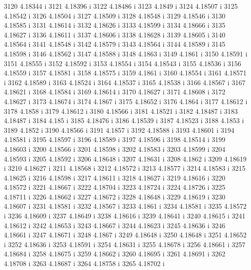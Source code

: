  3120  4.18344  i
 3121  4.18396  i
 3122  4.18486  i
 3123  4.1849  i
 3124  4.18507  i
 3125  4.18542  i
 3126  4.18504  i
 3127  4.18509  i
 3128  4.18548  i
 3129  4.18546  i
 3130  4.18585  i
 3131  4.18614  i
 3132  4.18626  i
 3133  4.18599  i
 3134  4.18666  i
 3135  4.18627  i
 3136  4.18611  i
 3137  4.18606  i
 3138  4.18628  i
 3139  4.18605  i
 3140  4.18564  i
 3141  4.18548  i
 3142  4.18579  i
 3143  4.18564  i
 3144  4.18589  i
 3145  4.18598  i
 3146  4.18562  i
 3147  4.18588  i
 3148  4.1863  i
 3149  4.1861  i
 3150  4.18591  i
 3151  4.18555  i
 3152  4.18592  i
 3153  4.18554  i
 3154  4.18543  i
 3155  4.18536  i
 3156  4.18559  i
 3157  4.18581  i
 3158  4.18575  i
 3159  4.1861  i
 3160  4.18554  i
 3161  4.18571  i
 3162  4.18589  i
 3163  4.18524  i
 3164  4.18537  i
 3165  4.18538  i
 3166  4.18567  i
 3167  4.18621  i
 3168  4.18584  i
 3169  4.18614  i
 3170  4.18627  i
 3171  4.18608  i
 3172  4.18627  i
 3173  4.18674  i
 3174  4.1867  i
 3175  4.18652  i
 3176  4.1864  i
 3177  4.18612  i
 3178  4.1858  i
 3179  4.18612  i
 3180  4.18566  i
 3181  4.18521  i
 3182  4.18487  i
 3183  4.18487  i
 3184  4.185  i
 3185  4.18476  i
 3186  4.18539  i
 3187  4.18523  i
 3188  4.1853  i
 3189  4.1852  i
 3190  4.18566  i
 3191  4.1857  i
 3192  4.18588  i
 3193  4.18601  i
 3194  4.18581  i
 3195  4.18597  i
 3196  4.18589  i
 3197  4.18596  i
 3198  4.18514  i
 3199  4.18603  i
 3200  4.18566  i
 3201  4.18598  i
 3202  4.18583  i
 3203  4.18599  i
 3204  4.18593  i
 3205  4.18592  i
 3206  4.18648  i
 3207  4.18631  i
 3208  4.1862  i
 3209  4.18619  i
 3210  4.18627  i
 3211  4.18568  i
 3212  4.18572  i
 3213  4.18577  i
 3214  4.18583  i
 3215  4.18625  i
 3216  4.18598  i
 3217  4.18611  i
 3218  4.18627  i
 3219  4.18616  i
 3220  4.18572  i
 3221  4.18667  i
 3222  4.18704  i
 3223  4.18724  i
 3224  4.18726  i
 3225  4.18711  i
 3226  4.18662  i
 3227  4.18672  i
 3228  4.18648  i
 3229  4.18619  i
 3230  4.18607  i
 3231  4.18581  i
 3232  4.18567  i
 3233  4.1861  i
 3234  4.18581  i
 3235  4.18572  i
 3236  4.18609  i
 3237  4.18649  i
 3238  4.18616  i
 3239  4.18641  i
 3240  4.18615  i
 3241  4.18612  i
 3242  4.18653  i
 3243  4.18667  i
 3244  4.18623  i
 3245  4.18636  i
 3246  4.18661  i
 3247  4.18671  i
 3248  4.1867  i
 3249  4.18648  i
 3250  4.18648  i
 3251  4.18652  i
 3252  4.18636  i
 3253  4.18591  i
 3254  4.18631  i
 3255  4.18678  i
 3256  4.18661  i
 3257  4.18684  i
 3258  4.18675  i
 3259  4.18662  i
 3260  4.18695  i
 3261  4.18691  i
 3262  4.18708  i
 3263  4.18687  i
 3264  4.18758  i
 3265  4.18702  i
